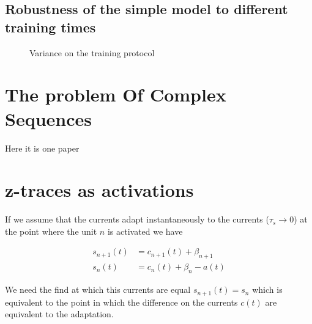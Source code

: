 \documentclass[10pt,a4paper]{article}
\begin{document}
\subsection{Robustness of the simple model to different training times}
\begin{figure}[H]
    \centering
    \qquad
    \caption{Variance on the training protocol}
	\label{fig:training_time_robustness}
\end{figure}

\section{The problem Of Complex Sequences}
Here it is one paper \cite{guyon1988storage}

\section{z-traces as activations}

If we assume that the currents adapt instantaneously to the currents ($\tau_s \to 0$) at the point where the unit $n$ is activated we have

\begin{align*}
s_{n + 1}(t) &= c_{n + 1}(t) + \beta_{n + 1}  \\
s_n(t) &= c_{n}(t) +  \beta_n  - a(t)
\end{align*}

We need the find at which this currents are equal
$s_{n + 1}(t) = s_{n}$ which is equivalent to the point in which the difference on the currents $c(t)$ are equivalent to the adaptation. 
\end{document}

